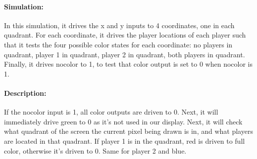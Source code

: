 \documentclass[]{article}
\begin{document}
\paragraph{Simulation:} In this simulation, it drives the x and y inputs to 4 coordinates, one in each quadrant.  For each coordinate, it drives the player locations of each player such that it tests the four possible color states for each coordinate: no players in quadrant, player 1 in quadrant, player 2 in quadrant, both players in quadrant.  Finally, it drives nocolor to 1, to test that color output is set to 0 when nocolor is 1.
\paragraph{Description:} If the nocolor input is 1, all color outputs are driven to 0.  Next, it will immediately drive green to 0 as it's not used in our display.  Next, it will check what quadrant of the screen the current pixel being drawn is in, and what players are located in that quadrant.  If player 1 is in the quadrant, red is driven to full color, otherwise it's driven to 0.  Same for player 2 and blue.
\end{document}
